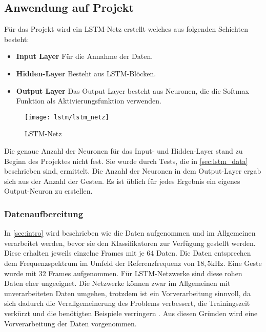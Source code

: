 \subsection{Anwendung auf Projekt}
Für das Projekt wird ein LSTM-Netz erstellt welches aus folgenden Schichten besteht:

\begin{itemize}
\item \textbf{Input Layer} Für die Annahme der Daten.
\item \textbf{Hidden-Layer} Besteht aus LSTM-Blöcken.
\item \textbf{Output Layer} Das Output Layer besteht aus Neuronen, die die 
Softmax Funktion als Aktivierungsfunktion verwenden.
\end{itemize}

\begin{figure}[htbp]
    \centering
   \texttt{[image: lstm/lstm\_netz]}
\caption{LSTM-Netz}
\label{fig:lstm_netz}
\end{figure}
Die genaue Anzahl der Neuronen für das Input- und Hidden-Layer stand zu Beginn
des Projektes nicht fest. Sie wurde durch Tests, die in \autoref{sec:lstm_data}
beschrieben sind, ermittelt. Die Anzahl der Neuronen in dem Output-Layer ergab
sich aus der Anzahl der Gesten. Es ist üblich für jedes Ergebnis ein eigenes
Output-Neuron zu erstellen.

\subsubsection{Datenaufbereitung}
\label{sec:lstm_data} 

In \autoref{sec:intro} wird beschrieben wie die Daten aufgenommen und im
Allgemeinen verarbeitet werden, bevor sie den Klassifikatoren zur Verfügung
gestellt werden. Diese erhalten jeweils einzelne Frames mit je 64 Daten. Die
Daten entsprechen dem Frequenzspektrum im Umfeld der Referenzfrequenz von
$18,5\text{kHz}$. Eine Geste wurde mit 32 Frames aufgenommen. Für
\ac{LSTM}-Netzwerke sind diese rohen Daten eher ungeeignet. Die Netzwerke können
zwar im Allgemeinen mit unverarbeiteten Daten umgehen, trotzdem ist ein
Vorverarbeitung sinnvoll, da sich dadurch die Verallgemeinerung des Problems
verbessert, die Trainingszeit verkürzt und die benötigten Beispiele verringern
\cite{RainerSchmoll2006}. Aus diesen Gründen wird eine Vorverarbeitung der Daten
vorgenommen.

